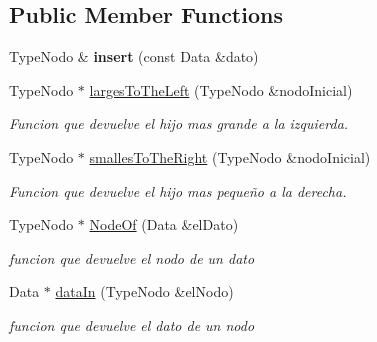 \subsection*{Public Member Functions}
\begin{DoxyCompactItemize}
\item 
\mbox{\label{class_binary_search_tree_adfac6a810d0b81e6772c63808684c8b2}} 
Type\+Nodo \& {\bfseries insert} (const Data \&dato)
\item 
\mbox{\label{class_binary_search_tree_af1b0c6778ed2f1a57d598ef33358b6d9}} 
Type\+Nodo $\ast$ \hyperlink{class_binary_search_tree_af1b0c6778ed2f1a57d598ef33358b6d9}{larges\+To\+The\+Left} (Type\+Nodo \&nodo\+Inicial)
\begin{DoxyCompactList}\small\item\em Funcion que devuelve el hijo mas grande a la izquierda. \end{DoxyCompactList}\item 
\mbox{\label{class_binary_search_tree_a0f845aaaa83043d56c187117e5829b9b}} 
Type\+Nodo $\ast$ \hyperlink{class_binary_search_tree_a0f845aaaa83043d56c187117e5829b9b}{smalles\+To\+The\+Right} (Type\+Nodo \&nodo\+Inicial)
\begin{DoxyCompactList}\small\item\em Funcion que devuelve el hijo mas pequeño a la derecha. \end{DoxyCompactList}\item 
\mbox{\label{class_binary_search_tree_a2267a608fb78e1eafe4531a67d2bf7c8}} 
Type\+Nodo $\ast$ \hyperlink{class_binary_search_tree_a2267a608fb78e1eafe4531a67d2bf7c8}{Node\+Of} (Data \&el\+Dato)
\begin{DoxyCompactList}\small\item\em funcion que devuelve el nodo de un dato \end{DoxyCompactList}\item 
\mbox{\label{class_binary_search_tree_ac08a812f7c83c1ee9a274099b38b5a62}} 
Data $\ast$ \hyperlink{class_binary_search_tree_ac08a812f7c83c1ee9a274099b38b5a62}{data\+In} (Type\+Nodo \&el\+Nodo)
\begin{DoxyCompactList}\small\item\em funcion que devuelve el dato de un nodo \end{DoxyCompactList}\item 

\end{DoxyCompactItemize}
